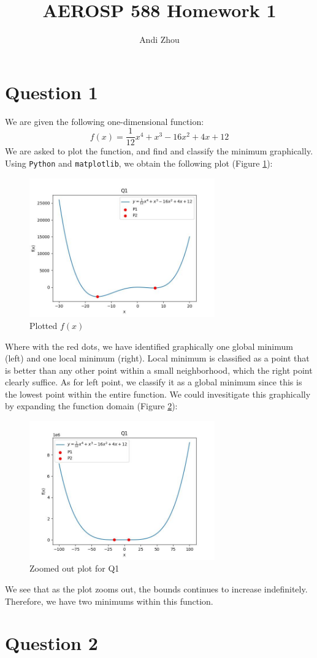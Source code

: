 \documentclass[a4paper]{article}
\title{AEROSP 588 Homework 1}
\author{Andi Zhou}
\begin{document}
\maketitle

\section{Question 1}
We are given the following one-dimensional function:
\begin{equation}
    f(x) = \frac{1}{12} x^4 + x^3 -16x^2 + 4x + 12
\end{equation}
We are asked to plot the function, and find and classify the minimum graphically. Using \texttt{Python} and \texttt{matplotlib}, we obtain the following plot (Figure \ref{fig:Q1_F1}):
\begin{figure}[h]
    \centering
    \includegraphics[width = 8cm]{HW1/Picture/Q1_F1.jpeg}
    \caption{Plotted $f(x)$}
    \label{fig:Q1_F1}
\end{figure}
Where with the red dots, we have identified graphically one global minimum (left) and one local minimum (right). Local minimum is classified as a point that is better than any other point within a small neighborhood, which the right point clearly suffice. As for left point, we classify it as a global minimum since this is the lowest point within the entire function. We could invesitigate this graphically by expanding the function domain (Figure \ref{fig:Q1_F2}):
\begin{figure}[H]
    \centering
    \includegraphics[width = 8cm]{HW1/Picture/Q1_F2.jpeg}
    \caption{Zoomed out plot for Q1}
    \label{fig:Q1_F2}
\end{figure}
We see that as the plot zooms out, the bounds continues to increase indefinitely. Therefore, we have two minimums within this function.

\section{Question 2}
\end{document}
